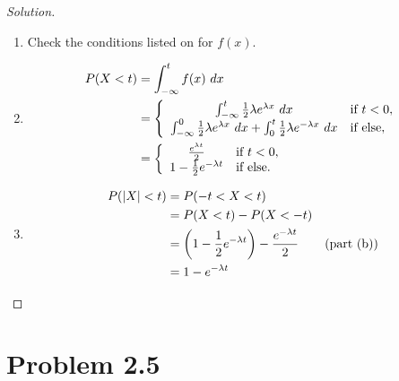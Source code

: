 \documentclass[12pt,letterpaper,reqno]{amsart}
\numberwithin{equation}{subsection}
\begin{document}
\begin{proof}[Solution]~\\

\begin{enumerate}[label=(\alph*),leftmargin=*]
    \item Check the conditions listed on \cite[Theorem 1.6.5 on page 36]{Berger-Casella} for $f(x)$.
    
    \item
    
    \begin{align*}
        \fun{P}{X < t} &= \myint{f(x)}{x}{-\infty}{t} \\
                       &= \left\{ \begin{array}{cl}
                            \myint{\frac{1}{2} \lambda e^{\lambda x}}{x}{-\infty}{t} & \mbox{if $t < 0$}, \\
                            \myint{\frac{1}{2} \lambda e^{\lambda x}}{x}{-\infty}{0} + \myint{\frac{1}{2} \lambda e^{-\lambda x}}{x}{0}{t} & \mbox{if else},
                       \end{array} \right. \\
                       &=  \left\{ \begin{array}{cl}
                            \frac{e^{\lambda t}}{2} & \mbox{if $t < 0$}, \\
                            1 - \frac{1}{2}e^{-\lambda t} & \mbox{if else}.
                       \end{array} \right.
    \end{align*}
    
    \item
    
    \begin{align*}
        \fun{P}{\Abs{X} < t} &= \fun{P}{-t < X < t} \\
                             &= \fun{P}{X < t} - \fun{P}{X < -t} \\
                             &= \left( 1 - \frac{1}{2}e^{-\lambda t} \right) -  \frac{e^{-\lambda t}}{2} & \left(\mbox{part (b)}\right) \\
                             &= 1 - e^{-\lambda t}
    \end{align*}
\end{enumerate}
\end{proof}

\newpage
\section{Problem 2.5}
\end{document}
